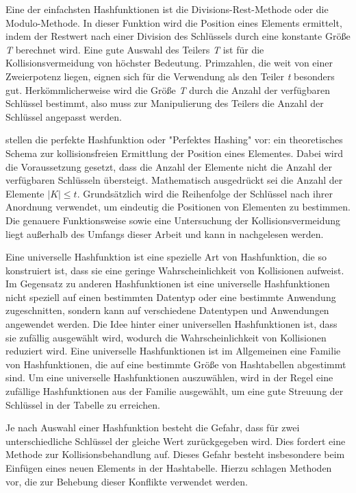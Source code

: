Eine der einfachsten Hashfunktionen ist die Divisions-Rest-Methode oder die Modulo-Methode. In dieser Funktion wird die Position eines Elements ermittelt, indem der Restwert nach einer Division des Schlüssels durch eine konstante Größe \textit{T} berechnet wird. Eine gute Auswahl des Teilers \textit{T} ist für die Kollisionsvermeidung von höchster Bedeutung. Primzahlen, die weit von einer Zweierpotenz liegen, eignen sich für die Verwendung als den Teiler \textit{t} besonders gut. Herkömmlicherweise wird die Größe \textit{T} durch die Anzahl der verfügbaren Schlüssel bestimmt, also muss zur Manipulierung des Teilers die Anzahl der Schlüssel angepasst werden. \autocite[230-231]{hubwieser_fundamente_2015}

\Textcite[232]{hubwieser_fundamente_2015} stellen die perfekte Hashfunktion oder "Perfektes Hashing" vor: ein theoretisches Schema zur kollisionsfreien Ermittlung der Position eines Elementes. Dabei wird die Voraussetzung gesetzt, dass die Anzahl der Elemente nicht die Anzahl der verfügbaren Schlüsseln übersteigt. Mathematisch ausgedrückt sei die Anzahl der Elemente $|K| \leq t$. Grundsätzlich wird die Reihenfolge der Schlüssel nach ihrer Anordnung verwendet, um eindeutig die Positionen von Elementen zu bestimmen. Die genauere Funktionsweise sowie eine Untersuchung der Kollisionsvermeidung liegt außerhalb des Umfangs dieser Arbeit und kann in \textcite[92-94]{mehlhorn_algorithms_2008} nachgelesen werden.

Eine universelle Hashfunktion ist eine spezielle Art von Hashfunktion, die so konstruiert ist, dass sie eine geringe Wahrscheinlichkeit von Kollisionen aufweist. Im Gegensatz zu anderen Hashfunktionen ist eine universelle Hashfunktionen nicht speziell auf einen bestimmten Datentyp oder eine bestimmte Anwendung zugeschnitten, sondern kann auf verschiedene Datentypen und Anwendungen angewendet werden. Die Idee hinter einer universellen Hashfunktionen ist, dass sie zufällig ausgewählt wird, wodurch die Wahrscheinlichkeit von Kollisionen reduziert wird. Eine universelle Hashfunktionen ist im Allgemeinen eine Familie von Hashfunktionen, die auf eine bestimmte Größe von Hashtabellen abgestimmt sind. Um eine universelle Hashfunktionen auszuwählen, wird in der Regel eine zufällige Hashfunktionen aus der Familie ausgewählt, um eine gute Streuung der Schlüssel in der Tabelle zu erreichen. \autocite[232-234]{hubwieser_fundamente_2015} \autocite[114-116]{knebl_algorithmen_2021}

Je nach Auswahl einer Hashfunktion besteht die Gefahr, dass für zwei unterschiedliche Schlüssel der gleiche Wert zurückgegeben wird. Dies fordert eine Methode zur Kollisionsbehandlung auf. Dieses Gefahr besteht insbesondere beim Einfügen eines neuen Elements in der Hashtabelle. Hierzu schlagen \textcite[568-572]{ernst_grundkurs_2020} Methoden vor, die zur Behebung dieser Konflikte verwendet werden. 

